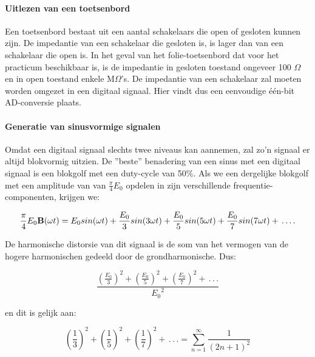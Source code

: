 \paragraph{Uitlezen van een toetsenbord}

Een toetsenbord bestaat uit een aantal schakelaars die open of ge\-sloten kunnen zijn. De impedantie van een schakelaar die gesloten is, is lager dan van een schakelaar die open is. In het geval van het folie-toetsenbord dat voor het practicum beschikbaar is, is de impedantie in gesloten toestand ongeveer 100 $\Omega$ en in open toestand enkele M$\Omega$'s.
De impedantie van een schakelaar zal moeten worden omgezet in een digitaal signaal. Hier vindt dus een eenvoudige \'e\'en-bit AD-conversie plaats.
\paragraph{Generatie van sinusvormige signalen}

Omdat een digitaal signaal slechts twee niveaus kan aannemen, zal zo'n signaal er altijd blokvormig uitzien. De ''beste'' benadering van een sinus met een digitaal signaal is een blokgolf met een duty-cycle van 50\%. Als we een dergelijke blokgolf met een amplitude van van $\frac \pi{4}E_{0}$ opdelen in zijn verschillende frequentie-componenten, krijgen we:

\begin{equation}
\frac \pi{4}E_{0}{\bf B} (\omega t) = E_{0}sin(\omega t)
+ \frac {E_{0}}{3}sin (3\omega t)
+ \frac {E_{0}}{5}sin (5\omega t)
+ \frac {E_{0}}{7}sin (7\omega t) 
+ \,.\,.\,.\,.
\end{equation}

De harmonische distorsie van dit signaal is de som van het vermogen van de hogere harmonischen gedeeld door de grondharmonische. Dus:


\begin{equation}
\frac{{\displaystyle \left( \frac{E_{0}}{3} \right) ^2}
+{\displaystyle \left( \frac{E_{0}}{5} \right) ^2}
+{\displaystyle \left( \frac{E_{0}}{7} \right) ^2}
+ \,.\,.\,.
}{{E_{0}}^2}
\end{equation}


en dit is gelijk aan:

\begin{equation}
{\displaystyle \left( \frac 1{3}\right)}^2
+{\displaystyle \left( \frac 1{5}\right)}^2
+{\displaystyle \left( \frac 1{7}\right)}^2
+\,.\,.\,. 
= \sum\limits_{n=1}^{\infty} \frac 1{{(2n+1)}^2}
\end{equation}

